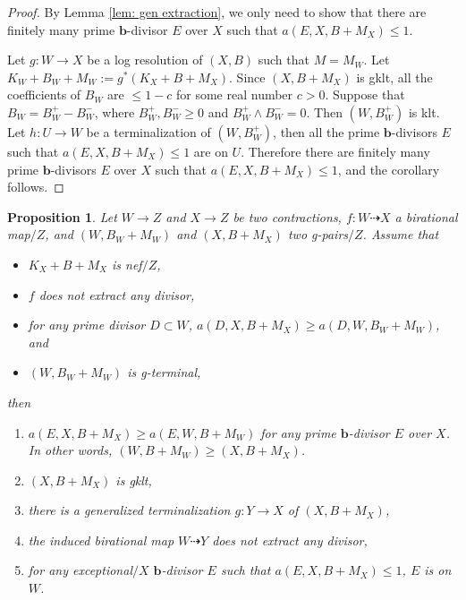 \documentclass[11pt]{amsart}
\numberwithin{equation}{section}
\newcommand{\bb}{\bm{b}}
\newtheorem{prop}[thm]{Proposition}
\theoremstyle{definition}
\theoremstyle{remark}
\theoremstyle{definition}
\begin{document}
\begin{proof}
By Lemma \ref{lem: gen extraction}, we only need to show that there are finitely many prime $\bb$-divisor $E$ over $X$ such that $a(E,X,B+M_X)\leq 1$.

Let $g: W\rightarrow X$ be a log resolution of $(X,B)$ such that $M=M_W$. Let $K_W+B_W+M_W:=g^*(K_X+B+M_X)$. Since $(X,B+M_X)$ is gklt, all the coefficients of $B_W$ are $\leq 1-c$ for some real number $c>0$. Suppose that $B_W=B_W^+-B_W^-$, where $B_W^+,B_W^-\geq 0$ and $B_W^+\wedge B_W^-=0$. Then $(W,B_W^+)$ is klt. Let $h:U\rightarrow W$ be a terminalization of $(W,B_W^+)$, then all the prime $\bb$-divisors $E$ such that $a(E,X,B+M_X)\leq 1$ are on $U$. Therefore there are finitely many prime $\bb$-divisors $E$ over $X$ such that $a(E,X,B+M_X)\leq 1$, and the corollary follows.
\end{proof}


\begin{prop}\label{prop: g terminalization prop} 
Let $W\rightarrow Z$ and $X\rightarrow Z$ be two contractions, $f:W\dashrightarrow X$ a birational map$/Z$, and $(W,B_W+M_W)$ and $(X,B+M_X)$ two g-pairs$/Z$. Assume that
\begin{itemize}
    \item $K_X+B+M_X$ is nef$/Z$,
    \item $f$ does not extract any divisor,
    \item for any prime divisor $D\subset W$, $a(D,X,B+M_X)\geq a(D,W,B_W+M_W)$, and
    \item $(W,B_W+M_W)$ is g-terminal,
\end{itemize}
then
\begin{enumerate}
    \item $a(E,X,B+M_X)\geq a(E,W,B+M_W)$ for any prime $\bb$-divisor $E$ over $X$. In other words, $(W,B+M_W)\geq (X,B+M_X)$.
    \item $(X,B+M_X)$ is gklt,
    \item there is a generalized terminalization $g: Y\rightarrow X$ of $(X,B+M_X)$,
    \item the induced birational map $W\dashrightarrow Y$ does not extract any divisor,
    \item for any exceptional$/X$ $\bb$-divisor $E$ such that $a(E,X,B+M_X)\leq 1$, $E$ is on $W$.
\end{enumerate}
\end{prop}
\end{document}

